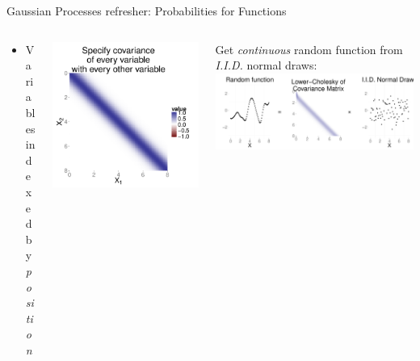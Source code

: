 \documentclass[final,t]{beamer}\usepackage[]{graphicx}\usepackage[]{color}
\makeatletter
\def\maxwidth{ %
  \ifdim\Gin@nat@width>\linewidth
    \linewidth
  \else
    \Gin@nat@width
  \fi
}
\newenvironment{knitrout}{}{} %
\makeatother
\begin{document}
\begin{frame}[fragile]
\begin{block}{Gaussian Processes refresher: Probabilities for Functions}
\begin{columns}[T]
\begin{column}{0.12\linewidth}
        \begin{itemize} \scriptsize
          \item Variables indexed by \textit{position}
        \end{itemize}
      \end{column}
      \begin{column}{0.12\linewidth}
\begin{knitrout}
\color{fgcolor}
\includegraphics[width=\maxwidth]{figure/covariance_matrix} 

\end{knitrout}

      \end{column}
      \begin{column}{0.28\linewidth}
        \centering
        Get \textit{continuous} random function
        from \textit{I.I.D.} normal draws:
        \vspace{0.4em}
\begin{knitrout}
\color{fgcolor}
\includegraphics[width=\maxwidth]{figure/random_function_draw} 


\end{knitrout}
\end{column}
\end{columns}
\end{block}
\end{frame}
\end{document}
